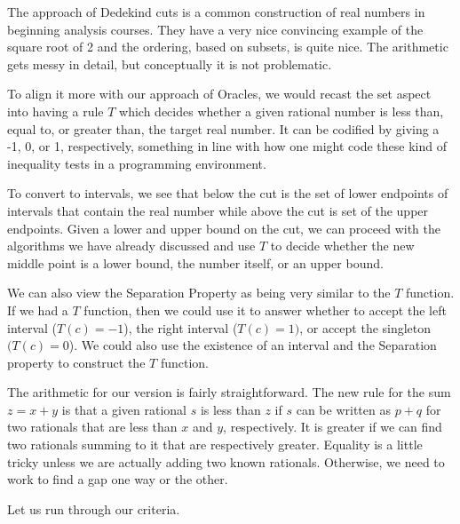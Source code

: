 \documentclass[12pt]{article}
\begin{document}
The approach of Dedekind cuts is a common construction of real numbers in beginning analysis courses. They have a very nice convincing example of the square root of 2 and the ordering, based on subsets, is quite nice. The arithmetic gets messy in detail, but conceptually it is not problematic. 

To align it more with our approach of Oracles, we would recast the set aspect into having a rule $T$ which decides whether a given rational number is less than, equal to, or greater than, the target real number. It can be codified by giving a -1, 0, or 1,  respectively, something in line with how one might code these kind of inequality tests in a programming environment. 

To convert to intervals, we see that below the cut is the set of lower endpoints of intervals that contain the real number while above the cut is set of the upper endpoints. Given a lower and upper bound on the cut, we can proceed with the algorithms we have already discussed and use $T$ to decide whether the new middle point is a lower bound, the number itself, or an upper bound. 

We can also view the Separation Property as being very similar to the $T$ function. If we had a $T$ function, then we could use it to answer whether to accept the left interval ($T(c) = -1$), the right interval ($T(c)=1)$, or accept the singleton $(T(c) = 0$). We could also use the existence of an interval and the Separation property to construct the $T$ function.

The arithmetic for our version is fairly straightforward. The new rule for the sum  $z = x+y$ is that a given rational $s$ is less than $z$ if $s$ can be written as $p+q$ for two rationals that are less than $x$ and $y$, respectively. It is greater if we can find two rationals summing to it that are respectively greater. Equality is a little tricky unless we are actually adding two known rationals. Otherwise, we need to work to find a gap one way or the other. 

Let us run through our criteria. 
\end{document}
